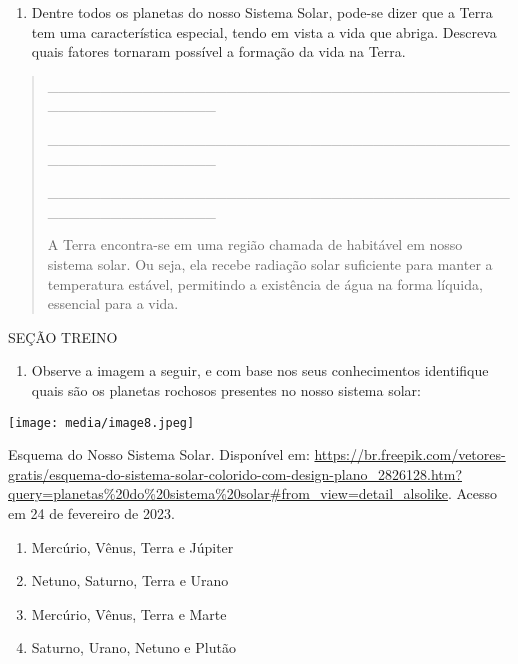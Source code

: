 \begin{enumerate}
\def\labelenumi{\arabic{enumi}.}
\item
  Dentre todos os planetas do nosso Sistema Solar, pode-se dizer que a
  Terra tem uma característica especial, tendo em vista a vida que
  abriga. Descreva quais fatores tornaram possível a formação da vida na
  Terra.
\end{enumerate}

\begin{quote}
\_\_\_\_\_\_\_\_\_\_\_\_\_\_\_\_\_\_\_\_\_\_\_\_\_\_\_\_\_\_\_\_\_\_\_\_\_\_\_\_\_\_\_\_\_\_\_\_\_\_\_\_\_\_\_\_\_\_\_\_

\_\_\_\_\_\_\_\_\_\_\_\_\_\_\_\_\_\_\_\_\_\_\_\_\_\_\_\_\_\_\_\_\_\_\_\_\_\_\_\_\_\_\_\_\_\_\_\_\_\_\_\_\_\_\_\_\_\_\_\_

\_\_\_\_\_\_\_\_\_\_\_\_\_\_\_\_\_\_\_\_\_\_\_\_\_\_\_\_\_\_\_\_\_\_\_\_\_\_\_\_\_\_\_\_\_\_\_\_\_\_\_\_\_\_\_\_\_\_\_\_

A Terra encontra-se em uma região chamada de habitável em nosso sistema
solar. Ou seja, ela recebe radiação solar suficiente para manter a
temperatura estável, permitindo a existência de água na forma líquida,
essencial para a vida.
\end{quote}

SEÇÃO TREINO

\begin{enumerate}
\def\labelenumi{\arabic{enumi})}
\item
  Observe a imagem a seguir, e com base nos seus conhecimentos
  identifique quais são os planetas rochosos presentes no nosso sistema
  solar:
\end{enumerate}

\texttt{[image: media/image8.jpeg]}

Esquema do Nosso Sistema Solar. Disponível em:
\url{https://br.freepik.com/vetores-gratis/esquema-do-sistema-solar-colorido-com-design-plano_2826128.htm?query=planetas\%20do\%20sistema\%20solar\#from_view=detail_alsolike}.
Acesso em 24 de fevereiro de 2023.

\begin{enumerate}
\def\labelenumi{(\Alph{enumi})}
\item
  Mercúrio, Vênus, Terra e Júpiter
\item
  Netuno, Saturno, Terra e Urano
\item
  Mercúrio, Vênus, Terra e Marte
\item
  Saturno, Urano, Netuno e Plutão
\end{enumerate}

